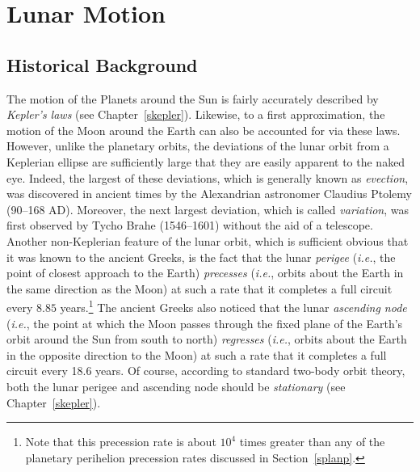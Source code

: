 \chapter{Lunar Motion}\label{moon}
\section{Historical Background}
The motion of the Planets around the Sun is   fairly accurately described by {\em Kepler's laws} (see Chapter~\ref{skepler}).
Likewise, to a first approximation, the motion of the Moon around the Earth can also be accounted for via these laws.
However, unlike the planetary orbits, the deviations of the lunar orbit from a Keplerian ellipse are sufficiently large that they
are easily apparent to the naked eye. Indeed, the largest of these deviations, which is generally known as
{\em evection}, was discovered in ancient times by the Alexandrian astronomer Claudius Ptolemy (90--168 AD). Moreover, the next largest deviation,
which is called {\em variation}, was first observed by Tycho Brahe (1546--1601) without the
aid of a telescope. Another non-Keplerian feature of the lunar orbit, which is sufficient obvious that it was known to the
ancient Greeks, is the fact that the lunar {\em perigee}\/ ({\em i.e.}, the point of closest approach to the Earth)
{\em precesses}\/  ({\em i.e.}, orbits about the Earth in the same direction as the Moon) at such a rate that it completes a full circuit
 every $8.85$ years.\footnote{Note that this precession rate is about $10^4$ times greater than any of the planetary perihelion precession
 rates discussed in Section~\ref{splanp}.} The ancient Greeks also noticed that the lunar {\em ascending node}\/ ({\em i.e.}, the point
at which the Moon passes through the fixed plane of the Earth's orbit around the Sun from south to north)
{\em regresses}\/  ({\em i.e.}, orbits about the Earth in the opposite direction to the Moon) at such a rate that it completes a full circuit  every 18.6 years. Of course, according to standard two-body orbit  theory, both the lunar perigee and  ascending node should be
{\em stationary} (see Chapter~\ref{skepler}). 

